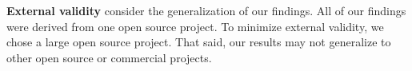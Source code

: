 \noindent \textbf{External validity} consider the generalization of our findings. All of our findings were derived from one open source project. To minimize external validity, we chose a large open source project. That said, our results may not generalize to other open source or commercial projects.